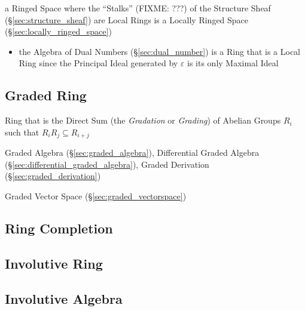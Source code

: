 a Ringed Space where the ``Stalks'' (FIXME: ???) of the Structure Sheaf
(\S\ref{sec:structure_sheaf}) are Local Rings is a Locally Ringed Space
(\S\ref{sec:locally_ringed_space})

\begin{itemize}
  \item the Algebra of Dual Numbers (\S\ref{sec:dual_number}) is a Ring that is
    a Local Ring since the Principal Ideal generated by $\varepsilon$ is its
    only Maximal Ideal
\end{itemize}


\subsection{Graded Ring}\label{sec:graded_ring}

Ring that is the Direct Sum (the \emph{Gradation} or \emph{Grading}) of Abelian
Groups $R_i$ such that $R_iR_j \subseteq R_{i+j}$

Graded Algebra (\S\ref{sec:graded_algebra}),
Differential Graded Algebra (\S\ref{sec:differential_graded_algebra}),
Graded Derivation (\S\ref{sec:graded_derivation})

Graded Vector Space (\S\ref{sec:graded_vectorspace})



\subsection{Ring Completion}\label{sec:ring_completion}

\subsection{Involutive Ring}\label{sec:involutive_ring}

\subsection{Involutive Algebra}\label{sec:involutive_algebra}

